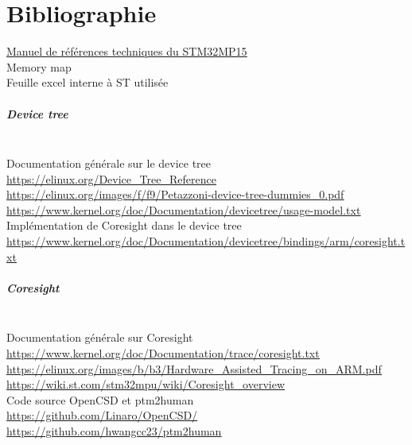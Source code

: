 
\newcommand{\uu}[1]{\textcolor{blue}{\underline{\url{#1}}}\\}
\newcommand{\hu}[2]{\textcolor{blue}{\underline{\href{#1}{#2}}}\\}

\chapter*{Bibliographie}


\noindent
\hu{https://www.st.com/resource/en/reference\_manual/dm00327659-stm32mp157-advanced-armbased-32bit-mpus-stmicroelectronics.pdf}{Manuel de références techniques du
STM32MP15}

\noindent
Memory map\\
Feuille excel interne à ST utilisée

\paragraph*{Device tree}\mbox{}\\
\noindent
Documentation générale sur le device tree\\
\uu{https://elinux.org/Device\_Tree\_Reference}
\uu{https://elinux.org/images/f/f9/Petazzoni-device-tree-dummies\_0.pdf}
\uu{https://www.kernel.org/doc/Documentation/devicetree/usage-model.txt}

\noindent
Implémentation de Coresight dans le device tree\\
\uu{https://www.kernel.org/doc/Documentation/devicetree/bindings/arm/coresight.txt}

\paragraph*{Coresight}\mbox{}\\
\noindent
Documentation générale sur Coresight\\
\uu{https://www.kernel.org/doc/Documentation/trace/coresight.txt}
\uu{https://elinux.org/images/b/b3/Hardware\_Assisted\_Tracing\_on\_ARM.pdf}
\uu{https://wiki.st.com/stm32mpu/wiki/Coresight\_overview}

\noindent
Code source OpenCSD et ptm2human\\
\uu{https://github.com/Linaro/OpenCSD/}
\uu{https://github.com/hwangcc23/ptm2human}

